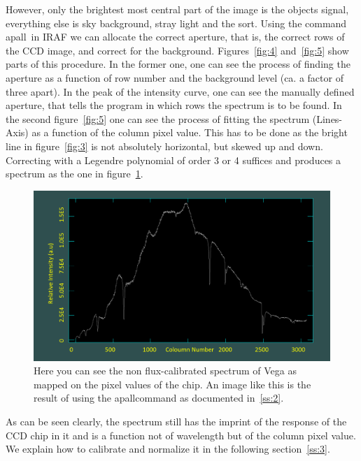 \documentclass{article}
\begin{document}
However, only the brightest most central part of the image is the objects signal, everything else is sky background, stray light and the sort. Using the command \glqq apall\grqq ~in IRAF we can allocate the correct aperture, that is, the correct rows of the CCD image, and correct for the background.  Figures~\ref{fig:4} and~\ref{fig:5} show parts of this procedure. In the former one, one can see the process of finding the aperture as a function of row number and the background level (ca. a factor of three apart). In the peak of the intensity curve, one can see the manually defined aperture, that tells the program in which rows the spectrum is to be found. In the second figure~\ref{fig:5} one can see the process of fitting the spectrum (\glqq Lines\grqq-Axis) as a function of the column pixel value. This has to be done as the bright line in figure~\ref{fig:3} is not absolutely horizontal, but skewed up and down. Correcting with a Legendre polynomial of order 3 or 4 suffices and produces a spectrum as the one in figure~\ref{fig:6}. 
\begin{figure}[H]
  	\centering
	\includegraphics[width=1.00\textwidth]{spectroscopy/unnorm_uncalib_vega.png}
  	\caption{Here you can see the non flux-calibrated spectrum of Vega as mapped on the pixel values of the chip. An image like this is the result of using the \glqq apall\grqq command as documented in~\ref{ss:2}.}
  	\label{fig:6}
\end{figure}
As can be seen clearly, the spectrum still has the imprint of the response of the CCD chip in it and is a function not of wavelength but of the column pixel value. We explain how to calibrate and normalize it in the following section~\ref{ss:3}.
\end{document}
